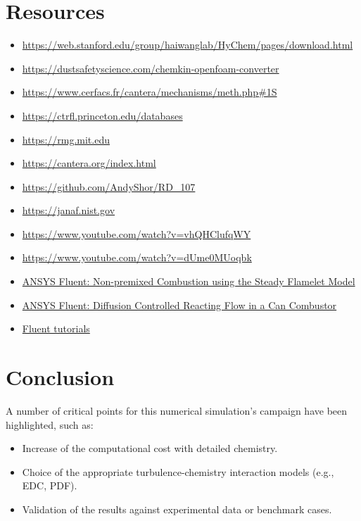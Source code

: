 \documentclass[12pt]{article}
\begin{document}
\section{Resources}
\begin{itemize}
    \item \url{https://web.stanford.edu/group/haiwanglab/HyChem/pages/download.html}
    \item \url{https://dustsafetyscience.com/chemkin-openfoam-converter}
    \item \url{https://www.cerfacs.fr/cantera/mechanisms/meth.php#1S}
    \item \url{https://ctrfl.princeton.edu/databases}
    \item \url{https://rmg.mit.edu}
    \item \url{https://cantera.org/index.html}
    \item \url{https://github.com/AndyShor/RD_107}
    \item \url{https://janaf.nist.gov}
    \item \url{https://www.youtube.com/watch?v=vhQHClufqWY} %
    \item \url{https://www.youtube.com/watch?v=dUme0MUoqbk} %
    \item \href{https://www.youtube.com/watch?v=wmWQBOAOtLc}{ANSYS Fluent: Non-premixed Combustion using the Steady Flamelet Model}
    \item \href{https://www.youtube.com/watch?v=PTdZyy6kxI0}{ANSYS Fluent: Diffusion Controlled Reacting Flow in a Can Combustor}
    \item \href{https://ansyshelp.ansys.com/public/account/secured?returnurl=/Views/Secured/prod_page.html?pn=Fluent}{Fluent tutorials}
\end{itemize}

\section{Conclusion}

A number of critical points for this numerical simulation's campaign have been highlighted, such as:
%
\begin{itemize}
    \item Increase of the computational cost with detailed chemistry.
    \item Choice of the appropriate turbulence-chemistry interaction models (e.g., EDC, PDF).
    \item Validation of the results against experimental data or benchmark cases.
\end{itemize}
\end{document}
